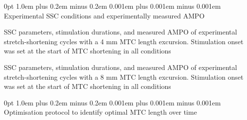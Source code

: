 \documentclass[
  11pt,
  a4paper]{article}
\makeatletter
\renewcommand{\section}{%
  \@startsection{section}{1}
    {0pt} 					%
    {1.0em plus 0.2em minus 0.2em} 	%
    {0.001em plus 0.001em minus 0.001em}    	%
    {\Large\bfseries\sffamily}%
}
\makeatother
\begin{document}
\newpage{}

\renewcommand{\thesection}{S\arabic{section}}
\setcounter{section}{1}


\section{Experimental SSC conditions and experimentally measured
AMPO}\label{experimental-ssc-conditions-and-experimentally-measured-ampo}

\begin{supptbl}[H]

\caption{\label{supptbl-sscpa}SSC parameters, stimulation durations, and
measured AMPO of experimental stretch-shortening cycles with a 4 mm MTC
length excursion. Stimulation onset was set at the start of MTC
shortening in all conditions}


\end{supptbl}%

\begin{supptbl}[H]

\caption{\label{supptbl-sscpb}SSC parameters, stimulation durations, and
measured AMPO of experimental stretch-shortening cycles with a 8 mm MTC
length excursion. Stimulation onset was set at the start of MTC
shortening in all conditions}


\end{supptbl}%

\newpage{}

\renewcommand{\thesection}{S\arabic{section}}
\setcounter{section}{2}


\section{Optimisation protocol to identify optimal MTC length over
time}\label{optimisation-protocol-to-identify-optimal-mtc-length-over-time}
\end{document}
